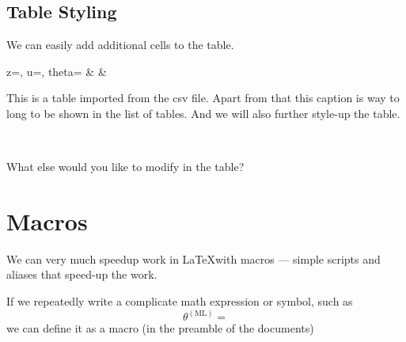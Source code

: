 \documentclass[a4paper,10pt]{report} %
\begin{document}
\newpage 
\subsection{Table Styling}

  We can easily add additional cells to the table.
  
  \begin{table}[h!] \label{tab:styled}
  \begin{center}
  {  z=\zvec, u=\uvec, theta=\thvec    %
  }{%
     \zvec  & \uvec & \thvec        %
  } %
  \caption[short table description]{This is a table imported from the csv file. Apart from that this caption is way to long to be shown in the list of tables. And we will also further style-up the table. }
  \end{center}
\end{table} ~\vspace{1ex}
  
  What else would you like to modify in the table?


\section{Macros}
We can very much speedup work in \LaTeX with macros --- simple scripts and aliases that speed-up the work.

If we repeatedly write a complicate math expression or symbol, such as
\[ \theta^{\scriptscriptstyle \mathrm{(ML)}} =  \]
we can define  it as a macro (in the preamble of the documents)
\end{document}
